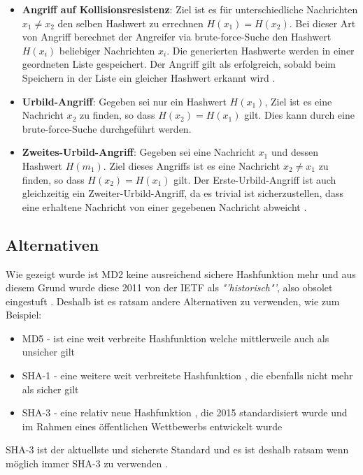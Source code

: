 \documentclass[course=erap]{aspdoc}
\begin{document}
\begin{itemize}
\item \textbf{Angriff auf Kollisionsresistenz}: Ziel ist es für unterschiedliche Nachrichten $x_{1}\neq x_{2}$ den selben Hashwert zu errechnen $H(x_{1}) = H(x_{2})$. Bei dieser Art von Angriff berechnet der Angreifer via brute-force-Suche den Hashwert $H(x_{i})$ beliebiger Nachrichten $x_{i}$. Die generierten Hashwerte werden in einer geordneten Liste gespeichert. Der Angriff gilt als erfolgreich, sobald beim Speichern in der Liste ein gleicher Hashwert erkannt wird \cite{Spitz2011}. 

\item \textbf{Urbild-Angriff}: Gegeben sei nur ein Hashwert $H(x_{1})$, Ziel ist es eine Nachricht $x_{2}$ zu finden, so dass $H(x_{2}) = H(x_{1})$ gilt. Dies kann durch eine brute-force-Suche durchgeführt werden\cite{attack}.

\item \textbf{Zweites-Urbild-Angriff}: Gegeben sei eine Nachricht $x_{1}$ und dessen Hashwert $H(m_{1})$. Ziel dieses Angriffs ist es eine Nachricht $x_{2} \neq x_{1}$ zu finden, so dass $H(x_{2}) = H(x_{1})$ gilt. Der Erste-Urbild-Angriff ist auch gleichzeitig ein Zweiter-Urbild-Angriff, da es trivial ist sicherzustellen, dass eine erhaltene Nachricht von einer gegebenen Nachricht abweicht \cite{urbild}.
\end{itemize}

\subsection{Alternativen}

Wie gezeigt wurde ist MD2 keine ausreichend sichere Hashfunktion mehr und aus diesem Grund wurde diese 2011 von der IETF als \textit{"'historisch"'}, also obsolet eingestuft \cite{rfc6149}. Deshalb ist es ratsam andere Alternativen zu verwenden, wie zum Beispiel\cite{Pelzl2016}:
\begin{itemize}
    \item MD5 - ist eine weit verbreite Hashfunktion welche mittlerweile auch als unsicher gilt
    \item SHA-1 - eine weitere weit verbreitete Hashfunktion , die ebenfalls nicht mehr als sicher gilt
    \item SHA-3 - eine relativ neue Hashfunktion , die 2015 standardisiert wurde und im Rahmen eines öffentlichen Wettbewerbs entwickelt wurde
\end{itemize}
SHA-3 ist der aktuellste und sicherste Standard und es ist deshalb ratsam wenn möglich immer SHA-3 zu verwenden \cite{Pelzl2016}.
\end{document}
